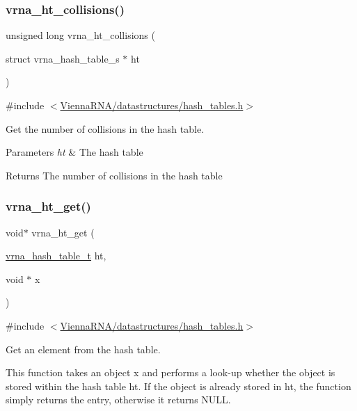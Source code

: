 \subsubsection{\texorpdfstring{vrna\+\_\+ht\+\_\+collisions()}{vrna\_ht\_collisions()}}
{\footnotesize\ttfamily unsigned long vrna\+\_\+ht\+\_\+collisions (\begin{DoxyParamCaption}\item[{struct vrna\+\_\+hash\+\_\+table\+\_\+s $\ast$}]{ht }\end{DoxyParamCaption})}



{\ttfamily \#include $<$\hyperlink{hash__tables_8h}{Vienna\+R\+N\+A/datastructures/hash\+\_\+tables.\+h}$>$}



Get the number of collisions in the hash table. 


\begin{DoxyParams}{Parameters}
{\em ht} & The hash table \\
\hline
\end{DoxyParams}
\begin{DoxyReturn}{Returns}
The number of collisions in the hash table 
\end{DoxyReturn}
\mbox{\label{group__hash__table__utils_ga38f124472c8e7e75f067d3b27b43da09}} 
\subsubsection{\texorpdfstring{vrna\+\_\+ht\+\_\+get()}{vrna\_ht\_get()}}
{\footnotesize\ttfamily void$\ast$ vrna\+\_\+ht\+\_\+get (\begin{DoxyParamCaption}\item[{\hyperlink{group__hash__table__utils_gabc7c6f41b718c8e23929e528891a89c4}{vrna\+\_\+hash\+\_\+table\+\_\+t}}]{ht,  }\item[{void $\ast$}]{x }\end{DoxyParamCaption})}



{\ttfamily \#include $<$\hyperlink{hash__tables_8h}{Vienna\+R\+N\+A/datastructures/hash\+\_\+tables.\+h}$>$}



Get an element from the hash table. 

This function takes an object {\ttfamily x} and performs a look-\/up whether the object is stored within the hash table {\ttfamily ht}. If the object is already stored in {\ttfamily ht}, the function simply returns the entry, otherwise it returns {\ttfamily N\+U\+LL}.

